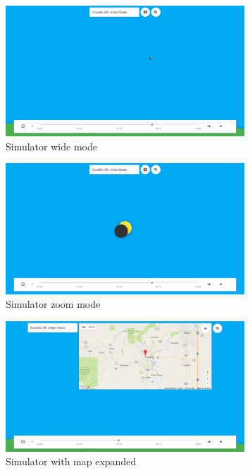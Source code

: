 \documentclass[10pt, onecolumn, draftclsnofoot, letterpaper, compsoc]{IEEEtran}
\begin{document}
\begin{figure}[!h]
	\begin{center}
  		\includegraphics[width=0.8\textwidth]{sim_wide.eps}
		\caption{Simulator wide mode}
	\end{center}
\end{figure}

\begin{figure}[!h]
	\begin{center}
			\includegraphics[width=0.8\textwidth]{sim_zoom.eps}
		\caption{Simulator zoom mode}
	\end{center}
\end{figure}

\begin{figure}[!h]
	\begin{center}
			\includegraphics[width=0.8\textwidth]{sim_map.eps}
		\caption{Simulator with map expanded}
	\end{center}
\end{figure}
\end{document}
